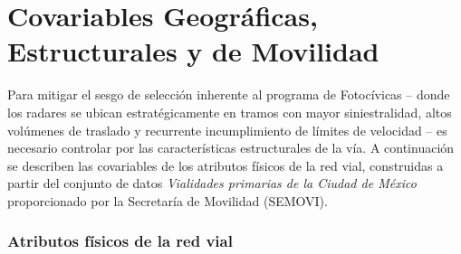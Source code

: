 \section{Covariables Geográficas, Estructurales y de Movilidad}
Para mitigar el sesgo de selección inherente al programa de Fotoc\'ivicas -- donde los radares se ubican estratégicamente en tramos con mayor siniestralidad, altos volúmenes de traslado y recurrente incumplimiento de límites de velocidad -- es necesario controlar por las características estructurales de la vía. A continuación se describen las covariables de los atributos físicos de la red vial, construidas a partir del conjunto de datos \textit{Vialidades primarias de la Ciudad de México} proporcionado por la Secretaría de Movilidad (SEMOVI). 

\subsubsection{Atributos físicos de la red vial}

